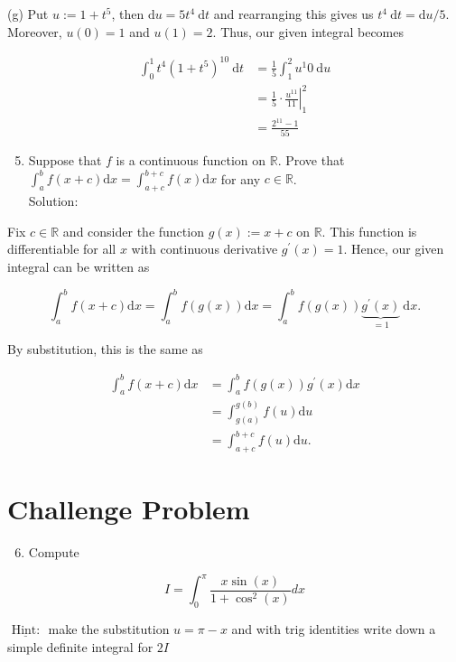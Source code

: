 \documentclass[10pt]{article}
\begin{document}
(g) Put $u:=1+t^{5}$, then $\mathrm{d} u=5 t^{4} \mathrm{~d} t$ and rearranging this gives us $t^{4} \mathrm{~d} t=\mathrm{d} u / 5$. Moreover, $u(0)=1$ and $u(1)=2$. Thus, our given integral becomes

$$
\begin{aligned}
\int_{0}^{1} t^{4}\left(1+t^{5}\right)^{10} \mathrm{~d} t & =\frac{1}{5} \int_{1}^{2} u^{1} 0 \mathrm{~d} u \\
& =\left.\frac{1}{5} \cdot \frac{u^{11}}{11}\right|_{1} ^{2} \\
& =\frac{2^{11}-1}{55}
\end{aligned}
$$

\begin{enumerate}
  \setcounter{enumi}{4}
  \item Suppose that $f$ is a continuous function on $\mathbb{R}$. Prove that $\int_{a}^{b} f(x+c) \mathrm{d} x=\int_{a+c}^{b+c} f(x) \mathrm{d} x$ for any $c \in \mathbb{R}$.\\
Solution:
\end{enumerate}

Fix $c \in \mathbb{R}$ and consider the function $g(x):=x+c$ on $\mathbb{R}$. This function is differentiable for all $x$ with continuous derivative $g^{\prime}(x)=1$. Hence, our given integral can be written as

$$
\int_{a}^{b} f(x+c) \mathrm{d} x=\int_{a}^{b} f(g(x)) \mathrm{d} x=\int_{a}^{b} f(g(x)) \underbrace{g^{\prime}(x)}_{=1} \mathrm{~d} x .
$$

By substitution, this is the same as

$$
\begin{aligned}
\int_{a}^{b} f(x+c) \mathrm{d} x & =\int_{a}^{b} f(g(x)) g^{\prime}(x) \mathrm{d} x \\
& =\int_{g(a)}^{g(b)} f(u) \mathrm{d} u \\
& =\int_{a+c}^{b+c} f(u) \mathrm{d} u .
\end{aligned}
$$

\section*{Challenge Problem}
\begin{enumerate}
  \setcounter{enumi}{5}
  \item Compute
\end{enumerate}

$$
I=\int_{0}^{\pi} \frac{x \sin (x)}{1+\cos ^{2}(x)} d x
$$

$\underline{\text { Hint: }}$ make the substitution $u=\pi-x$ and with trig identities write down a simple definite integral for $2 I$
\end{document}
